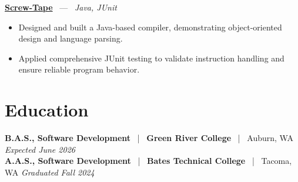 \documentclass[10pt, letterpaper]{article}
\newcommand{\jobhead}[4]{%
  \vspace{5pt}%
  {\bfseries\color{dark}#1}%
  ~{\color{light}|}~%
  {\bfseries\color{navy}#2}%
  ~{\color{light}|}~%
  {\color{light}#3}%
  \hfill{\color{light}\small\textit{#4}}\\[-2pt]%
}
\newcommand{\projhead}[3]{%
  \vspace{5pt}%
  {\bfseries\color{dark}\href{#2}{#1}}%
  ~{\color{light}---}~%
  {\color{light}\small\textit{#3}}\\[-2pt]%
}
\begin{document}
\projhead{Screw-Tape}{https://github.com/timmyd4/screwtape}{Java, JUnit}
\begin{itemize}
  \item Designed and built a Java-based compiler, demonstrating object-oriented design and language parsing.
  \item Applied comprehensive JUnit testing to validate instruction handling and ensure reliable program behavior.
\end{itemize}

\section{Education}

\jobhead{B.A.S., Software Development}{Green River College}{Auburn, WA}{Expected June 2026}
\jobhead{A.A.S., Software Development}{Bates Technical College}{Tacoma, WA}{Graduated Fall 2024}
\end{document}
